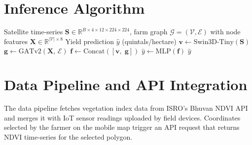 \section{Inference Algorithm}

\begin{algorithm}
\caption{AgriMitra Multi-Modal Yield Prediction Inference}
\label{alg:inference}
\begin{algorithmic}[1]
\REQUIRE Satellite time-series $\mathbf{S} \in \mathbb{R}^{B \times 4 \times 12 \times 224 \times 224}$,
         farm graph $\mathcal{G}=(\mathcal{V},\mathcal{E})$ with node features
         $\mathbf{X} \in \mathbb{R}^{|\mathcal{V}| \times 8}$
\ENSURE  Yield prediction $\hat{y}$ (quintals/hectare)
\STATE $\mathbf{v} \leftarrow \text{Swin3D-Tiny}(\mathbf{S})$
\STATE $\mathbf{g} \leftarrow \text{GATv2}(\mathbf{X},\,\mathcal{E})$
\STATE $\mathbf{f} \leftarrow \text{Concat}([\mathbf{v},\;\mathbf{g}])$
\STATE $\hat{y} \leftarrow \text{MLP}(\mathbf{f})$
\RETURN $\hat{y}$
\end{algorithmic}
\end{algorithm}

\section{Data Pipeline and API Integration}

The data pipeline fetches vegetation index data from ISRO's Bhuvan NDVI API and merges it with IoT sensor readings uploaded by field devices. Coordinates selected by the farmer on the mobile map trigger an API request that returns NDVI time-series for the selected polygon.

